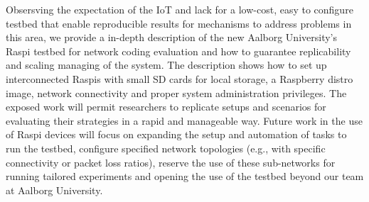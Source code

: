 \label{sec:conclusions}
Obsersving the expectation of the \ac{IoT} and lack for a low-cost, easy to configure testbed that enable reproducible results for mechanisms to address problems in this area, we provide a in-depth description of the new Aalborg University's \ac{Raspi} testbed for network coding evaluation and how to guarantee replicability and scaling managing of the system. The description shows how to set up interconnected \ac{Raspi}s with small SD cards for local storage, a Raspberry distro image, network connectivity and proper system administration privileges. The exposed work will permit researchers to replicate setups and scenarios for evaluating their strategies in a rapid and manageable way. Future work in the use of \ac{Raspi} devices will focus on expanding the setup and automation of tasks to run the testbed, configure specified network topologies (e.g., with specific connectivity or packet loss ratios), reserve the use of these sub-networks for running tailored experiments and opening the use of the testbed beyond our team at Aalborg University.
